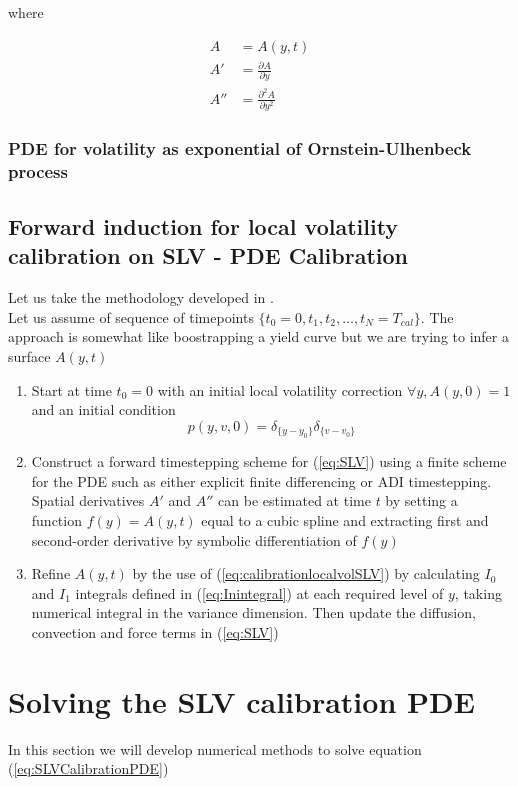 \documentclass{article}
\begin{document}
\noindent where 

\begin{equation}
\begin{aligned}
A&= A(y,t)\\
A' &= \frac{\partial A}{\partial y}\\
A'' &= \frac{\partial^2 A}{\partial y^2}
\end{aligned}
\end{equation}

\subsubsection{PDE for volatility as exponential of Ornstein-Ulhenbeck process}
\subsection{Forward induction for local volatility calibration on SLV - PDE Calibration}
Let us take the methodology developed in \cite{Clark2010}.\\
Let us assume of sequence of timepoints $\{t_0 = 0, t_1, t_2, \dots, t_N = T_{cal}\}$. The approach is somewhat like boostrapping a yield curve but we are trying to infer a surface $A(y,t)$

\begin{enumerate}
	\item Start at time $t_0 = 0$ with an initial local volatility correction $\forall y, A(y,0) = 1$ and an initial condition
\begin{equation}
	p(y,v,0) = \delta_{\{y-y_0\}} \delta_{\{v-v_0\}}
\end{equation}
	\item Construct a forward timestepping scheme for (\ref{eq:SLV}) using a finite scheme for the PDE such as either explicit finite differencing or ADI timestepping. Spatial derivatives $A'$ and $A''$ can be estimated at time $t$ by setting a function $f(y) = A(y,t)$ equal to a cubic spline and extracting first and second-order derivative by symbolic differentiation of $f(y)$
	\item Refine $A(y,t)$ by the use of (\ref{eq:calibrationlocalvolSLV}) by calculating $I_0$ and $I_1$ integrals defined in (\ref{eq:Inintegral}) at each required level of $y$, taking numerical integral in the variance dimension. Then update the diffusion, convection and force terms in (\ref{eq:SLV})
\end{enumerate}
\section{Solving the SLV calibration PDE}
In this section we will develop numerical methods to solve equation (\ref{eq:SLVCalibrationPDE})
\end{document}
